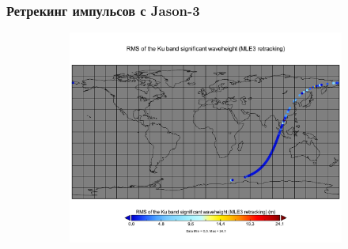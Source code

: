 \documentclass[10pt,pdf,hyperref={unicode}, dvipsnames]{beamer}
\begin{document}
\begin{frame}
\frametitle{Ретрекинг импульсов с Jason-3}
\vskip -3pt
\begin{figure}[ht]
    \centering
    \begin{subfigure}{\linewidth}
        \centering
        \includegraphics[width=\linewidth]{img/swh_rms_ku_mle3}
    \end{subfigure}
\end{figure}
\end{frame}
\end{document}
